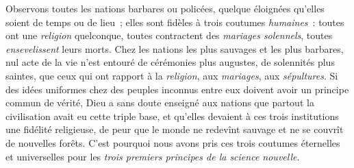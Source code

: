 \documentclass[french,twoside]{book} %
\begin{document}
Observons toutes les nations barbares ou policées, quelque éloignées qu’elles soient de temps ou de lieu ; elles sont fidèles à trois coutumes {\itshape humaines} : toutes ont une {\itshape religion} quelconque, toutes contractent des {\itshape mariages solennels}, toutes {\itshape ensevelissent} leurs morts. Chez les nations les plus sauvages et les plus barbares, nul acte de la vie n’est entouré de cérémonies plus augustes, de solennités plus saintes, que ceux qui ont rapport à la {\itshape religion}, aux {\itshape mariages}, aux {\itshape sépultures}. Si des idées uniformes chez des peuples inconnus entre eux doivent avoir un principe commun de vérité, Dieu a sans doute enseigné aux nations que partout la civilisation avait eu cette triple base, et qu’elles devaient à ces trois institutions une fidélité religieuse, de peur que le monde ne redevînt sauvage et ne se couvrît de nouvelles forêts. C’est pourquoi nous avons pris ces trois coutumes éternelles et universelles pour les {\itshape trois premiers principes de la science nouvelle}.\par
\end{document}
